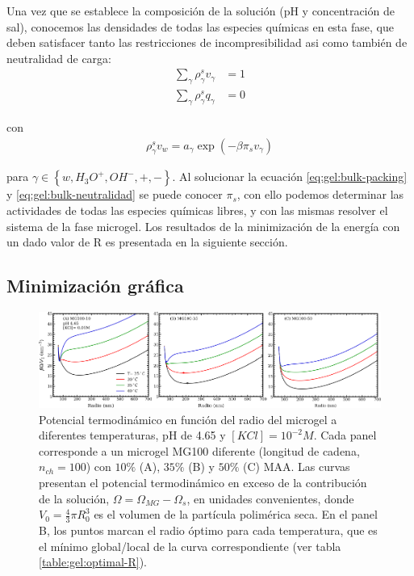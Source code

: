 Una vez que se establece la composici\'on de la soluci\'on (pH y concentraci\'on de sal), conocemos las densidades de todas las especies qu\'imicas en esta fase, que deben satisfacer tanto las restricciones de incompresibilidad asi como tambi\'en  de neutralidad de carga:
%
%
\begin{align}
\sum_{\gamma  } \rho_\gamma^s v_\gamma  &=1\label{eq:gel:bulk-packing}\\
\sum_{\gamma  } \rho_\gamma^s q_\gamma  &=0 \label{eq:gel:bulk-neutralidad}
\end{align}

\noindent con
%
%
\begin{align}
\rho_\gamma^s v_w= a_\gamma \exp(-\beta\pi_s v_\gamma)
\label{eq:gel:bulk-electroneutrality}
\end{align}



\noindent para $\gamma \in \left\{ w, H_3O^+, OH^-, +,- \right\}$. Al solucionar la ecuaci\'on \ref{eq:gel:bulk-packing} y \ref{eq:gel:bulk-neutralidad} se puede conocer  $\pi_s$, con ello podemos determinar las actividades de todas las especies qu\'imicas libres, y con las mismas resolver el sistema de la fase microgel.
Los resultados de la minimizaci\'on de la energ\'ia con un dado valor de R es presentada en la siguiente secci\'on.

\subsection{Minimizaci\'on gr\'afica}\label{sec:gel:minimi}

\begin{figure}[!htb]
\centering
\includegraphics[width=0.99\linewidth]{Figures/graph-gel/graph-min.pdf}
\caption{Potencial termodin\'amico en funci\'on del radio del microgel a diferentes temperaturas, pH  de 4.65 y $[KCl]=10^{-2}M$.
	Cada panel corresponde a un microgel MG100 diferente (longitud de cadena, $n_{ch}=100$) con $10\%$ (A), $35\%$ (B) y $50\%$ (C) MAA.
	Las curvas presentan el potencial termodin\'amico en exceso de la contribuci\'on de la soluci\'on, $\Omega=\Omega_{MG}-\Omega_s$, en unidades convenientes, donde $V_0=\frac{4}{3}\pi R_0^3$ es el volumen de la part\'icula polim\'erica seca.
	En el panel B, los puntos  marcan el radio \'optimo para cada temperatura, que es el m\'inimo global/local de la curva correspondiente (ver tabla \ref{table:gel:optimal-R}).}
\label{fig:gel:graph-min}
\end{figure}

